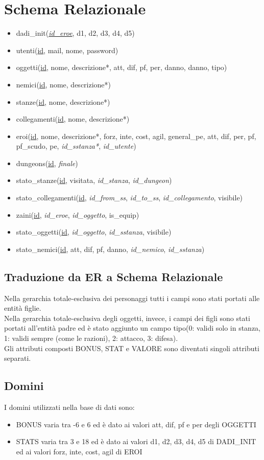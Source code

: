 \documentclass[11pt]{article}
\begin{document}
\section{Schema Relazionale}
\begin{itemize}
\item dadi\_init(\underline{\textit{id\_eroe}}, d1, d2, d3, d4, d5)
\item utenti(\underline{id}, mail, nome, password)
\item oggetti(\underline{id}, nome, descrizione*, att, dif, pf, per, danno, danno, tipo)
\item nemici(\underline{id}, nome, descrizione*)
\item stanze(\underline{id}, nome, descrizione*)
\item collegamenti(\underline{id}, nome, descrizione*)
\item eroi(\underline{id}, nome, descrizione*, forz, inte, cost, agil, general\_pe, att, dif, per, pf, pf\_scudo, pe, \textit{id\_sstanza*}, \textit{id\_utente})
\item dungeons(\underline{id}, \textit{finale})
\item stato\_stanze(\underline{id}, visitata, \textit{id\_stanza}, \textit{id\_dungeon})
\item stato\_collegamenti(\underline{id}, \textit{id\_from\_ss}, \textit{id\_to\_ss}, \textit{id\_collegamento}, visibile)
\item zaini(\underline{id}, \textit{id\_eroe}, \textit{id\_oggetto}, is\_equip)
\item stato\_oggetti(\underline{id}, \textit{id\_oggetto}, \textit{id\_sstanza}, visibile)
\item stato\_nemici(\underline{id}, att, dif, pf, danno, \textit{id\_nemico}, \textit{id\_sstanza})
\end{itemize}
\subsection{Traduzione da ER a Schema Relazionale}
Nella gerarchia totale-esclusiva dei personaggi tutti i campi sono stati portati alle entità figlie.\\
Nella gerarchia totale-esclusiva degli oggetti, invece, i campi dei figli sono stati portati all'entità padre ed è stato aggiunto un campo tipo(0: validi solo in stanza, 1: validi sempre (come le razioni), 2: attacco, 3: difesa).\\
Gli attributi composti BONUS, STAT e VALORE sono diventati singoli attributi separati.
\subsection{Domini}
I domini utilizzati nella base di dati sono:
\begin{itemize}
\item BONUS varia tra -6 e 6 ed è dato ai valori att, dif, pf e per degli OGGETTI
\item STATS varia tra 3 e 18 ed è dato ai valori d1, d2, d3, d4, d5 di DADI\_INIT ed ai valori forz, inte, cost, agil di EROI
\end{itemize}
\end{document}
